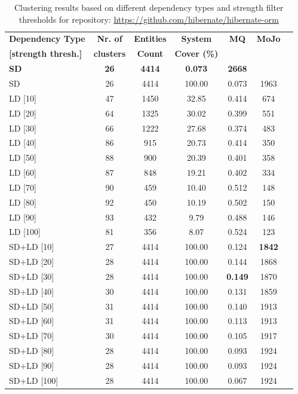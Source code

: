\documentclass{ieeeaccess}
\begin{document}
\begin{table}
\caption{Clustering results based on different dependency types and strength filter thresholds for repository: \href{https://github.com/hibernate/hibernate-orm}{https://github.com/hibernate/hibernate-orm}}
\label{tab:clustering_results_hibernate}
\centering
\setlength{\tabcolsep}{3pt}
\begin{tabular}{|l|c|c|c|c|c|c|}
\hline
\textbf{Dependency Type} & \textbf{Nr. of} & \textbf{Entities} & \textbf{System} & \textbf{MQ} & \textbf{MoJo} \\
\textbf{[strength thresh.]} & \textbf{clusters} & \textbf{Count} & \textbf{Cover (\%)} &  &  \\
\hline
\textbf{SD} & \textbf{26} & \textbf{4414} & \textbf{0.073} & \textbf{2668} \\
\hline
SD & 26 & 4414 & 100.00 & 0.073 & 1963 \\
\hline
LD [10] & 47 & 1450 & 32.85 & 0.414 & 674 \\
LD [20] & 64 & 1325 & 30.02 & 0.399 & 551 \\
LD [30] & 66 & 1222 & 27.68 & 0.374 & 483 \\
LD [40] & 86 & 915 & 20.73 & 0.414 & 350 \\
LD [50] & 88 & 900 & 20.39 & 0.401 & 358 \\
LD [60] & 87 & 848 & 19.21 & 0.402 & 334 \\
LD [70] & 90 & 459 & 10.40 & 0.512 & 148 \\
LD [80] & 92 & 450 & 10.19 & 0.502 & 150 \\
LD [90] & 93 & 432 & 9.79 & 0.488 & 146 \\
LD [100] & 81 & 356 & 8.07 & 0.524 & 123 \\
\hline
SD+LD [10] & 27 & 4414 & 100.00 & 0.124 &  \cellcolor[HTML]{C0C0C0}\textbf{1842} \\
SD+LD [20] & 28 & 4414 & 100.00 & 0.144 & 1868 \\
SD+LD [30] & 28 & 4414 & 100.00 &  \cellcolor[HTML]{C0C0C0}\textbf{0.149}& 1870 \\
SD+LD [40] & 30 & 4414 & 100.00 & 0.131 & 1859 \\
SD+LD [50] & 31 & 4414 & 100.00 & 0.140 & 1913 \\
SD+LD [60] & 31 & 4414 & 100.00 & 0.113 & 1913 \\
SD+LD [70] & 30 & 4414 & 100.00 & 0.105 & 1917 \\
SD+LD [80] & 28 & 4414 & 100.00 & 0.093 & 1924 \\
SD+LD [90] & 28 & 4414 & 100.00 & 0.093 & 1924 \\
SD+LD [100] & 28 & 4414 & 100.00 & 0.067 & 1924 \\
\hline
\end{tabular}
\end{table}
\end{document}
